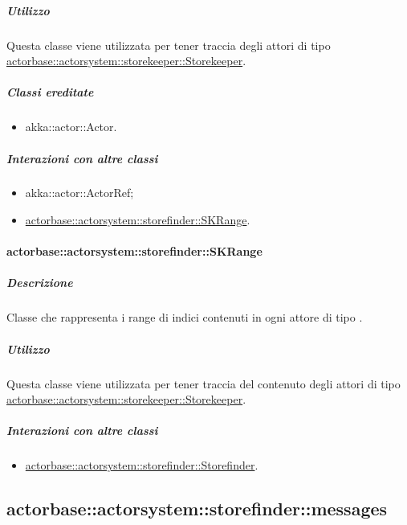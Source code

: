 \documentclass{scalatekids-article}
\begin{document}
\subparagraph{Utilizzo}

Questa classe viene utilizzata per tener traccia degli attori di tipo
\hyperref[sec:actorbase::actorsystem::storekeeper::Storekeeper]{actorbase::actorsystem::storekeeper::Storekeeper}.

\subparagraph{Classi ereditate}

\begin{itemize}

\item akka::actor::Actor.

\end{itemize}

\subparagraph{Interazioni con altre classi}

\begin{itemize}
\item akka::actor::ActorRef;
\item \hyperref[sec:actorbase::actorsystem::storefinder::SKRange]{actorbase::actorsystem::storefinder::SKRange}.
\end{itemize}

\paragraph{actorbase::actorsystem::storefinder::SKRange}
\label{sec:actorbase::actorsystem::storefinder::SKRange}

\subparagraph{Descrizione}

Classe che rappresenta i range di indici contenuti in ogni attore di tipo
.

\subparagraph{Utilizzo}

Questa classe viene utilizzata per tener traccia del contenuto degli attori di tipo
\hyperref[sec:actorbase::actorsystem::storekeeper::Storekeeper]{actorbase::actorsystem::storekeeper::Storekeeper}.

\subparagraph{Interazioni con altre classi}

\begin{itemize}
\item \hyperref[sec:actorbase::actorsystem::storefinder::Storefinder]{actorbase::actorsystem::storefinder::Storefinder}.
\end{itemize}

\subsection{actorbase::actorsystem::storefinder::messages}
\label{sec:actorbase::actorsystem::storefinder::messages}
\end{document}
